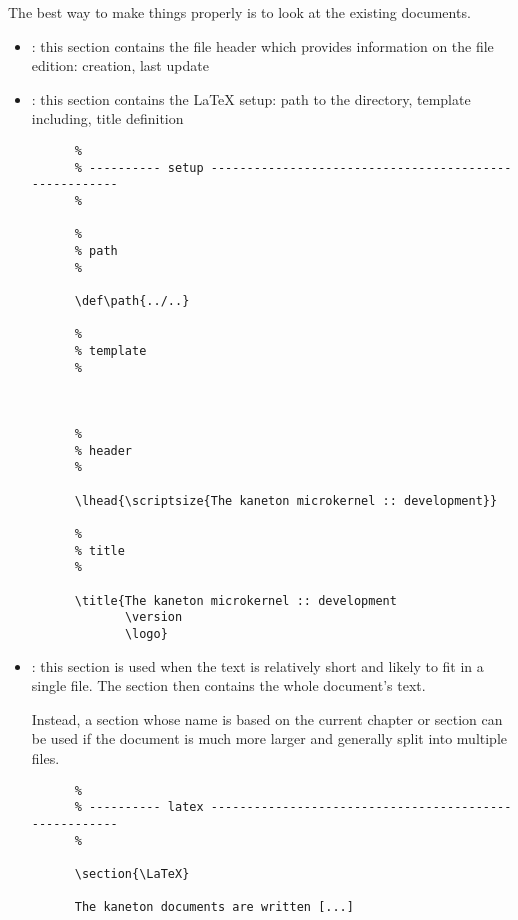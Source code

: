 The best way to make things properly is to look at the existing documents.

\begin{itemize}
  \item
    : this section contains the file header which provides
    information on the file edition: creation, last update \etc{}
  \item
    : this section contains the {\LaTeX} setup: path to the
     directory, template including, title definition \etc{}

    \begin{verbatim}
      %
      % ---------- setup ------------------------------------------------------
      %

      %
      % path
      %

      \def\path{../..}

      %
      % template
      %

      

      %
      % header
      %

      \lhead{\scriptsize{The kaneton microkernel :: development}}

      %
      % title
      %

      \title{The kaneton microkernel :: development
             \version
             \logo}
    \end{verbatim}
  \item
    : this section is used when the text is relatively short
    and likely to fit in a single file. The section then contains the
    whole document's text.

    Instead, a section whose name is based on the current chapter or section
    can be used if the document is much more larger and generally split
    into multiple files.

    \begin{verbatim}
      %
      % ---------- latex ------------------------------------------------------
      %

      \section{\LaTeX}

      The kaneton documents are written [...]
    \end{verbatim}
\end{itemize}

%
%

